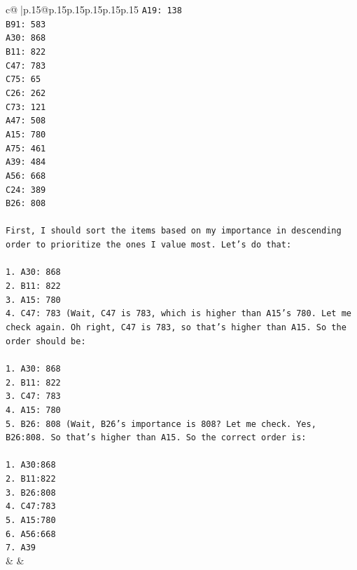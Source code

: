 \documentclass{article}
\begin{document}
{\begin{supertabular}{c@{$\;$}|p{.15\linewidth}@{}p{.15\linewidth}p{.15\linewidth}p{.15\linewidth}p{.15\linewidth}p{.15\linewidth}}
{{{\texttt{A19: 138} \\
\texttt{B91: 583} \\
\texttt{A30: 868} \\
\texttt{B11: 822} \\
\texttt{C47: 783} \\
\texttt{C75: 65} \\
\texttt{C26: 262} \\
\texttt{C73: 121} \\
\texttt{A47: 508} \\
\texttt{A15: 780} \\
\texttt{A75: 461} \\
\texttt{A39: 484} \\
\texttt{A56: 668} \\
\texttt{C24: 389} \\
\texttt{B26: 808} \\
\\ 
\texttt{First, I should sort the items based on my importance in descending order to prioritize the ones I value most. Let's do that:} \\
\\ 
\texttt{1. A30: 868} \\
\texttt{2. B11: 822} \\
\texttt{3. A15: 780} \\
\texttt{4. C47: 783 (Wait, C47 is 783, which is higher than A15's 780. Let me check again. Oh right, C47 is 783, so that's higher than A15. So the order should be:} \\
\\ 
\texttt{1. A30: 868} \\
\texttt{2. B11: 822} \\
\texttt{3. C47: 783} \\
\texttt{4. A15: 780} \\
\texttt{5. B26: 808 (Wait, B26's importance is 808? Let me check. Yes, B26:808. So that's higher than A15. So the correct order is:} \\
\\ 
\texttt{1. A30:868} \\
\texttt{2. B11:822} \\
\texttt{3. B26:808} \\
\texttt{4. C47:783} \\
\texttt{5. A15:780} \\
\texttt{6. A56:668} \\
\texttt{7. A39} \\
            }
        }
    }
    & & \\ \\


\end{supertabular}}
\end{document}
